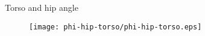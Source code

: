\begin{frame}{Torso and hip angle}%
    \begin{figure}[H]%
        \centering%
        \texttt{[image: phi-hip-torso/phi-hip-torso.eps]}
    \end{figure}%
\end{frame}%
%